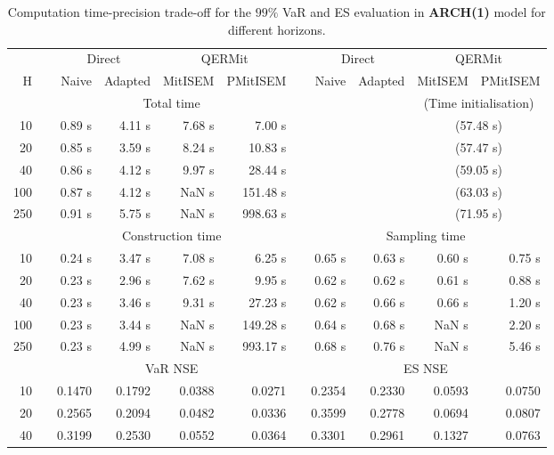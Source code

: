 \footnotesize{  
{ \renewcommand{\arraystretch}{1.3} 
\begin{longtable}{rr rrrr r rrrr}  
\caption{Computation time-precision trade-off for the  $99\%$ VaR and ES evaluation in \textbf{ARCH(1)} model for different horizons.} 
\label{tab:time_precision_arch} \\ 
 & & \multicolumn{2}{c}{Direct} & \multicolumn{2}{c}{QERMit}&  & \multicolumn{2}{c}{Direct} & \multicolumn{2}{c}{QERMit} \\ \cline{3-6} \cline{8-11} 
 H & & Naive & Adapted & MitISEM & PMitISEM & & Naive & Adapted & MitISEM & PMitISEM \\ \hline 
 & & \multicolumn{4}{c}{Total time} & & && \multicolumn{2}{c}{(Time initialisation)} \\ \cline{3-6} \cline{10-11}
10 & & 0.89 s & 4.11 s & 7.68 s & 7.00 s &&&& \multicolumn{2}{c}{(57.48 s)} \\ 
20 & & 0.85 s & 3.59 s & 8.24 s & 10.83 s &&&& \multicolumn{2}{c}{(57.47 s)} \\ 
40 & & 0.86 s & 4.12 s & 9.97 s & 28.44 s &&&& \multicolumn{2}{c}{(59.05 s)} \\ 
100 & & 0.87 s & 4.12 s &  NaN s & 151.48 s &&&& \multicolumn{2}{c}{(63.03 s)} \\ 
250 & & 0.91 s & 5.75 s &  NaN s & 998.63 s &&&& \multicolumn{2}{c}{(71.95 s)} \\ 
\hline 
 & & \multicolumn{4}{c}{Construction time} & & \multicolumn{4}{c}{ Sampling time} \\ \cline{3-6}  \cline{8-11}
10 & & 0.24 s & 3.47 s & 7.08 s & 6.25 s && 0.65 s & 0.63 s & 0.60 s & 0.75 s \\ 
20 & & 0.23 s & 2.96 s & 7.62 s & 9.95 s && 0.62 s & 0.62 s & 0.61 s & 0.88 s \\ 
40 & & 0.23 s & 3.46 s & 9.31 s & 27.23 s && 0.62 s & 0.66 s & 0.66 s & 1.20 s \\ 
100 & & 0.23 s & 3.44 s &  NaN s & 149.28 s && 0.64 s & 0.68 s &  NaN s & 2.20 s \\ 
250 & & 0.23 s & 4.99 s &  NaN s & 993.17 s && 0.68 s & 0.76 s &  NaN s & 5.46 s \\ 
\hline 
 & & \multicolumn{4}{c}{VaR NSE} &&  \multicolumn{4}{c}{ES NSE} \\ \cline{3-6}  \cline{8-11}
10 && 0.1470  & 0.1792  & 0.0388 & 0.0271 && 0.2354  & 0.2330  & 0.0593 & 0.0750 \\ 
20 && 0.2565  & 0.2094  & 0.0482 & 0.0336 && 0.3599  & 0.2778  & 0.0694 & 0.0807 \\ 
40 && 0.3199  & 0.2530  & 0.0552 & 0.0364 && 0.3301  & 0.2961  & 0.1327 & 0.0763 \\ 

\end{longtable}}}
